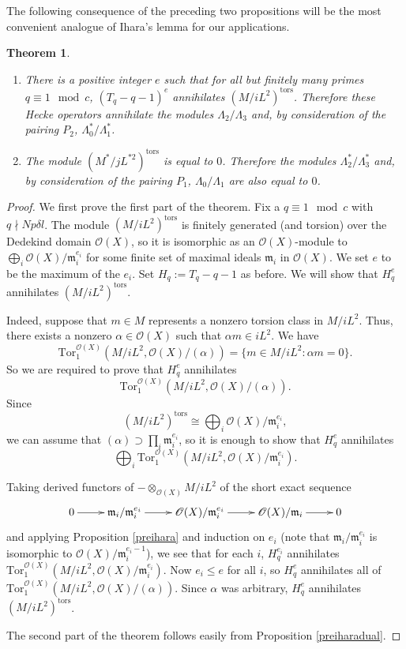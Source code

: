 \documentclass[a4paper, notitlepage]{amsart}
\newcommand{\m}{\ensuremath{\mathfrak{m}}\xspace}
\newcommand{\OO}{\ensuremath{\mathscr{O}}\xspace}
\newtheorem{theorem}{Theorem}
\begin{document}
The following consequence of the preceding two propositions will be the most convenient analogue of Ihara's lemma for our applications.
\begin{theorem}\label{lemma:trivialtorsion}
\begin{enumerate} \item There is a positive integer $e$ such that for all but finitely many primes $q\equiv 1 \mod c$, $(T_q-q-1)^{e}$ annihilates $(M/iL^2)^{\mathrm{tors}}$.  Therefore these Hecke operators annihilate the modules $\Lambda_2/\Lambda_3$ and, by consideration of the pairing $P_2$, $\Lambda_0^*/\Lambda_1^*$.
\item The module $(M^*/jL^{*2})^{\mathrm{tors}}$ is equal to $0$. Therefore the modules $\Lambda_2^*/\Lambda_3^*$ and, by consideration of the pairing $P_1$, $\Lambda_0/\Lambda_1$ are also equal to $0$.\end{enumerate}
\end{theorem}
\begin{proof}
We first prove the first part of the theorem. Fix a $q \equiv 1 \mod c$ with $q \nmid Np\delta l$. The module $(M/iL^2)^{\mathrm{tors}}$ is finitely generated (and torsion) over the Dedekind domain $\OO(X)$, so it is isomorphic as an $\OO(X)$-module to $\bigoplus_i \OO(X)/\m_i^{e_i}$ for some finite set of maximal ideals $\m_i$ in $\OO(X)$. We set $e$ to be the maximum of the $e_i$. Set $H_q:=T_q-q-1$ as before. We will show that $H_q^{e}$ annihilates $(M/iL^2)^{\mathrm{tors}}$.

Indeed, suppose that $m \in M$ represents a nonzero torsion class in $M/iL^2$. Thus, there exists a nonzero $\alpha \in \OO(X)$ such that $\alpha m \in iL^2$. We have $$\mathrm{Tor}_1^{\OO(X)}(M/iL^2,\OO(X)/(\alpha))=\{m \in M/iL^2 : \alpha m = 0\}.$$ So we are required to prove that $H_q^e$ annihilates $$\mathrm{Tor}_1^{\OO(X)}(M/iL^2,\OO(X)/(\alpha)).$$
Since $$(M/iL^2)^{\mathrm{tors}}\cong \bigoplus_i \OO(X)/\m_i^{e_i},$$ we can assume that $(\alpha)\supset \prod_i \m_i^{e_i}$, so it is enough to show that $H_q^e$ annihilates $$\bigoplus_i \mathrm{Tor}_1^{\OO(X)}(M/iL^2,\OO(X)/\m_i^{e_i}).$$
 
Taking derived functors of $-\otimes_{\OO(X)} M/iL^2$ of the short exact sequence
$$\xymatrix{
0\ar[r]&\m_i/\m_i^{e_i}\ar[r]&\OO(X)/\m_i^{e_i}\ar[r]&\OO(X)/\m_i\ar[r]&0
}$$
and applying Proposition \ref{preihara} and induction on $e_i$ (note that $\m_i/\m_i^{e_i}$ is isomorphic to $\OO(X)/\m_i^{e_i-1}$), we see that for each $i$, $H_q^{e_i}$ annihilates $\mathrm{Tor}_1^{\OO(X)}(M/iL^2,\OO(X)/\m_i^{e_i})$. Now $e_i \le e$ for all $i$, so $H_q^e$ annihilates all of $\mathrm{Tor}_1^{\OO(X)}(M/iL^2,\OO(X)/(\alpha))$. Since $\alpha$ was arbitrary, $H_q^e$ annihilates $(M/iL^2)^{\mathrm{tors}}$.

The second part of the theorem follows easily from Proposition \ref{preiharadual}.
\end{proof}
\end{document}
